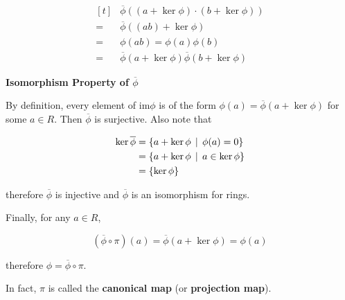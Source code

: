 \documentclass[a4paper,12pt]{article}
\begin{document}
\begin{thm}
\begin{alist}
    $$\begin{aligned}[t]
      &\overline{\phi}((a+\ker\phi)\cdot(b+\ker\phi))\\
      =&\overline{\phi}((ab)+\ker\phi)\\
      =&\phi(ab)=\phi(a)\phi(b)\\
      =&\overline{\phi}(a+\ker\phi)\overline{\phi}(b+\ker\phi)
    \end{aligned}$$

    \item \textbf{Isomorphism Property of $\overline{\phi}$}\n

    By definition, every element of $\mathrm{im}\phi$ is of the form $\phi(a)=\overline{\phi}(a+\ker\phi)$ for some $a\in R$. Then $\overline{\phi}$ is surjective. Also note that

    $$\begin{aligned}[t]
      \ker\overline{\phi}&=\left\{ a+\ker\phi\,\mid\,\phi(a)=0\right\}\\
      &=\left\{ a+\ker\phi\,\mid\, a\in\ker\phi\right\}\\
      &=\left\{ \ker\phi\right\}
    \end{aligned}$$\s

    therefore $\overline{\phi}$ is injective and $\overline{\phi}$ is an isomorphism for rings.
  \end{alist}

  Finally, for any $a\in R$,

  $$(\overline{\phi}\circ\pi)(a)=\overline{\phi}(a+\ker\phi)=\phi(a)$$\s

  therefore $\phi=\overline{\phi}\circ\pi$.
\end{thm}

In fact, $\pi$ is called the \textbf{canonical map} (or \textbf{projection map}).\n
\end{document}
